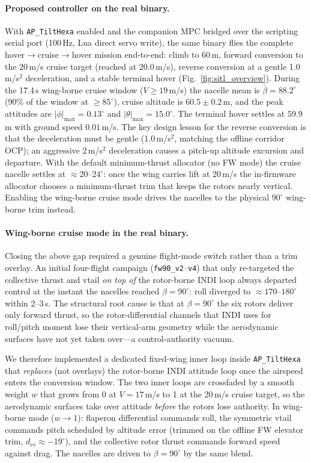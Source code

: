 \documentclass[preprint,3p,11pt]{elsarticle}
\begin{document}
\paragraph{Proposed controller on the real binary.}
With \texttt{AP\_TiltHexa} enabled and the companion MPC bridged over the
scripting serial port (100\,Hz, Lua direct servo write), the same binary flies
the complete hover$\to$cruise$\to$hover mission end-to-end: climb to 60\,m,
forward conversion to the 20\,m/s cruise target (reached at 20.0\,m/s),
reverse conversion at a gentle 1.0\,m/s$^2$ deceleration, and a stable terminal
hover (Fig.~\ref{fig:sitl_overview}). During the 17.4\,s wing-borne cruise
window ($V\ge19$\,m/s) the nacelle mean is $\bar\beta=88.2^\circ$ (90\% of the
window at $\ge85^\circ$), cruise altitude is $60.5\pm0.2$\,m, and the peak
attitudes are $|\phi|_{\max}=0.13^\circ$ and $|\theta|_{\max}=15.0^\circ$.
The terminal hover settles at $59.9$\,m with ground speed $0.01$\,m/s.
The key design lesson for the reverse conversion is that the deceleration must
be gentle (1.0\,m/s$^2$, matching the offline corridor OCP); an aggressive
2\,m/s$^2$ deceleration causes a pitch-up altitude excursion and departure.
With the default minimum-thrust allocator (no FW mode) the cruise nacelle
settles at $\approx20$--$24^\circ$: once the wing carries lift at 20\,m/s the
in-firmware allocator chooses a minimum-thrust trim that keeps the rotors
nearly vertical. Enabling the wing-borne cruise mode drives the nacelles to
the physical $90^\circ$ wing-borne trim instead.

\paragraph{Wing-borne cruise mode in the real binary.}
Closing the above gap required a genuine flight-mode switch rather than a trim
overlay. An initial four-flight campaign (\texttt{fw90\_v2}--\texttt{v4}) that
only re-targeted the collective thrust and vtail \emph{on top of} the rotor-borne
INDI loop always departed control at the instant the nacelles reached
$\beta=90^\circ$: roll diverged to $\approx170$--$180^\circ$ within 2--3\,s. The
structural root cause is that at $\beta=90^\circ$ the six rotors deliver only
forward thrust, so the rotor-differential channels that INDI uses for roll/pitch
moment lose their vertical-arm geometry while the aerodynamic surfaces have not
yet taken over---a control-authority vacuum.

We therefore implemented a dedicated fixed-wing inner loop inside
\texttt{AP\_TiltHexa} that \emph{replaces} (not overlays) the rotor-borne INDI
attitude loop once the airspeed enters the conversion window. The two inner
loops are crossfaded by a smooth weight $w$ that grows from 0 at
$V=17$\,m/s to 1 at the 20\,m/s cruise target, so the aerodynamic surfaces take
over attitude \emph{before} the rotors lose authority. In wing-borne mode
($w\to1$): flaperon differential commands roll, the symmetric vtail commands
pitch scheduled by altitude error (trimmed on the offline FW elevator trim,
$d_{rv}\approx-19^\circ$), and the collective rotor thrust commands forward
speed against drag. The nacelles are driven to $\beta=90^\circ$ by the same
blend.
\end{document}
